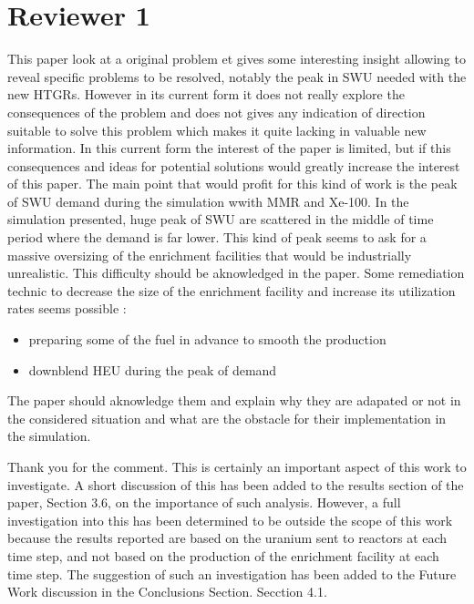 \documentclass[answers,11pt]{exam}
\begin{document}
\section*{Reviewer 1}
\begin{questions}

        \question This paper look at a original problem et gives some 
        interesting insight allowing to reveal specific problems to be resolved, 
        notably the peak in SWU needed with the new HTGRs. However in its 
        current form it does not really explore the consequences of the problem 
        and does not gives any indication of direction suitable to solve this 
        problem which makes it quite lacking in valuable new information.
        In this current form the interest of the paper is limited, but if this 
        consequences and ideas for potential solutions would greatly increase 
        the interest of this paper. The main point that would profit for this 
        kind of work is the peak of SWU demand during the simulation wwith MMR 
        and Xe-100. In the simulation presented, huge peak of SWU are scattered 
        in the middle of time period where the demand is far lower. This kind of 
        peak seems to ask for a massive oversizing of the enrichment facilities 
        that would be industrially unrealistic. This difficulty should be 
        aknowledged in the paper. Some remediation technic to decrease the 
        size of the enrichment facility and increase its utilization rates seems 
        possible :
        \begin{itemize}
                \item preparing some of the fuel in advance to smooth the production
                \item downblend HEU during the peak of demand 
        \end{itemize}
        The paper should aknowledge them and explain why they are adapated or 
        not in the considered situation and what are the obstacle for their 
        implementation in the simulation.
        \begin{solution}
                Thank you for the comment. This is certainly an important aspect of 
                this work to investigate. A short discussion of this has been added 
                to the results section of the paper, Section 3.6, on the importance 
                of such analysis. However, a full investigation into this has been 
                determined to be outside the scope of this work because the 
                results reported are based on the uranium sent to reactors at each 
                time step, and not based on the production of the enrichment 
                facility at each time step. The suggestion of such an investigation 
                has been added to the Future Work discussion in the Conclusions 
                Section. Secction 4.1. 
        \end{solution}


\end{questions}
\end{document}
